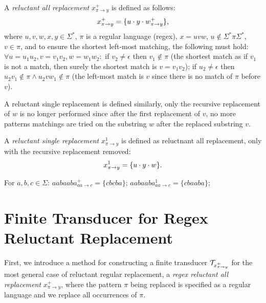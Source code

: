 \begin{definition} \hfill \newline
  A \emph{reluctant all replacement} $x^{+}_{\pi \rightarrow y}$ is defined as follows: \newline
  $$x^{+}_{\pi \rightarrow y} = \{ u \cdot y \cdot w^{+}_{\pi \rightarrow y} \} \text{,}$$
  where $u, v, w, x, y \in \Sigma^*$, $\pi$ is a regular language (regex), $x = u v w$, $u \notin \Sigma^* \pi \Sigma^*$, $v \in \pi$, and to ensure the shortest left-most matching, the following must hold: $\forall u = u_1 u_2, v = v_1 v_2, w = w_1 w_2:$ if $v_2 \neq \epsilon$ then $v_1 \notin \pi$ (the shortest match as if $v_1$ is not a match, then surely the  shortest match is $v = v_1v_2$); if $u_2 \neq \epsilon$ then $u_2 v_1 \notin \pi \land u_2 v w_1 \notin \pi$ (the left-most match is $v$ since there is no match of $\pi$ before $v$).
\end{definition}

A reluctant single replacement is defined similarly, only the recursive replacement of $w$ is no longer performed since after the first replacement of $v$, no more patterns matchings are tried on the substring $w$ after the replaced substring $v$.
\begin{definition} \hfill \newline
  A \emph{reluctant single replacement} $x^{1}_{\pi \rightarrow y}$ is defined as reluctnant all replacement, only with the recursive replacement removed:
  $$x^{1}_{\pi \rightarrow y} = \{ u \cdot y \cdot w \} \text{.}$$
\end{definition}

\begin{example}
  For $a, b, c \in \Sigma$: $aabaaba^{+}_{aa \rightarrow c} = \{ cbcba \}$; $aabaaba^{1}_{aa \rightarrow c} = \{ cbaaba \}$;
\end{example}

\section{Finite Transducer for Regex Reluctant Replacement}

First, we introduce a method for constructing a finite transducer $\mathcal{T}_{x^{+}_{\pi \rightarrow y}}$ for the most general case of reluctant regular replacement, a \emph{regex reluctant all replacement} $x^{+}_{\pi \rightarrow y}$, where the pattern $\pi$ being replaced is specified as a regular language and we replace all occurrences of $\pi$.

